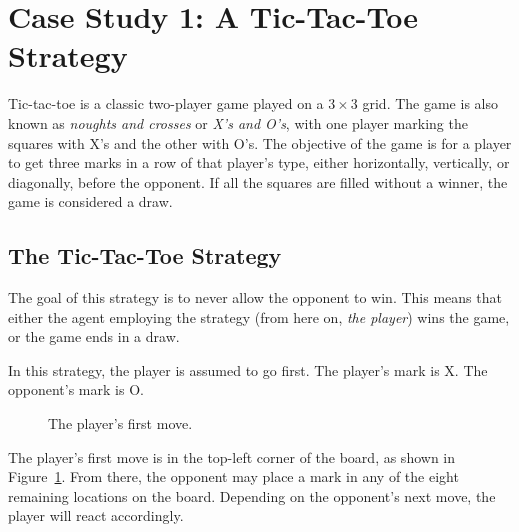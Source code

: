 
\section{Case Study 1: A Tic-Tac-Toe Strategy}\label{sec:tic-tac-toe}

Tic-tac-toe is a classic two-player game played on a $3 \times 3$ grid.
The game is also known as \textit{noughts and crosses} or \textit{X's and O's},
with one player marking the squares with X's and the other with O's.
The objective of the game is for a player to get three marks in a row of that
player's type, either horizontally, vertically, or diagonally, before the
opponent.
If all the squares are filled without a winner, the game is considered a draw.

\subsection{The Tic-Tac-Toe Strategy}\label{subsec:the-tic-tac-toe-strategy}

The goal of this strategy is to never allow the opponent to win.
This means that either the agent employing the strategy
(from here on, \textit{the player}) wins the game, or the game ends in a draw.

In this strategy, the player is assumed to go first.
The player's mark is X\@.
The opponent's mark is O\@.

\begin{figure}
    \begin{center}
        \tictactoeboard{+}{ }{ }{ }{ }{ }{ }{ }{ }
    \end{center}
    \caption{The player's first move.}
    \label{fig:ttt-move-1}
\end{figure}

The player's first move is in the top-left corner of the board,
as shown in Figure~\ref{fig:ttt-move-1}.
From there, the opponent may place a mark in any of the eight remaining
locations on the board.
Depending on the opponent's next move, the player will react accordingly.

